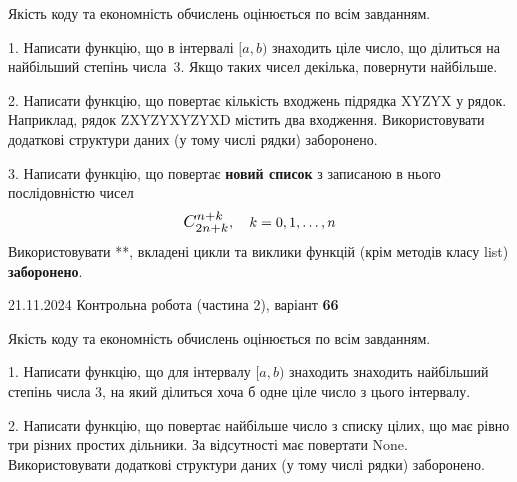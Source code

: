 \documentclass[12pt, ukrainian]{article}
\begin{document}
{{{{{{
\begin {large}
Якість коду та економність обчислень оцінюється по всім завданням.

\vspace{5mm}

1. Написати функцію, що в інтервалі $[a, b)$ знаходить ціле число, що ділиться на найбільший степінь числа 3. Якщо таких чисел декілька, повернути найбільше.

\vspace{10mm}


2. Написати функцію, що повертає кількість входжень підрядка XYZYX у рядок. Наприклад, рядок ZXYZYXYZYXD містить два входження. Використовувати додаткові структури даних (у тому числі рядки) заборонено.

\vspace{10mm}


3. 
Написати функцію, що повертає \textbf{новий список} з записаною в нього послідовністю чисел
$$\scalebox{1.2}{$C_{2n+k}^{n+k}$}, \quad k=0,1,\ldots,n$$
Використовувати **, вкладені цикли та виклики функцій (крім методів класу list) \textbf{заборонено}.

\end{large}
\newpage
{{21.11.2024 Контрольна робота  (частина 2), варіант  \No \textbf { 66 }\par}}


{
\begin {large}
Якість коду та економність обчислень оцінюється по всім завданням.

\vspace{5mm}

1. Написати функцію, що для інтервалу $[a, b)$ знаходить знаходить найбільший степінь числа 3, на який ділиться хоча б одне ціле число з цього інтервалу.

\vspace{10mm}


2. Написати функцію, що повертає найбільше число з списку цілих, що має рівно три різних простих дільники. За відсутності має повертати None. Використовувати додаткові структури даних (у тому числі рядки) заборонено.


\end{large}}}}}}}}
\end{document}
